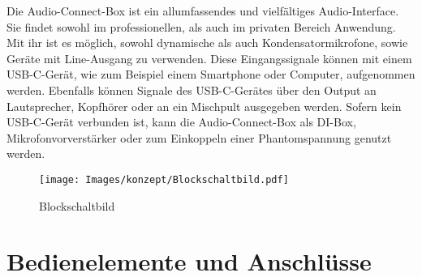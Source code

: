 Die Audio-Connect-Box ist ein allumfassendes und vielfältiges Audio-Interface. 
Sie findet sowohl im professionellen, als auch im privaten Bereich Anwendung.
Mit ihr ist es möglich, sowohl dynamische als auch Kondensatormikrofone, sowie Geräte mit Line-Ausgang zu verwenden. 
Diese Eingangssignale können mit einem USB-C-Gerät, wie zum Beispiel einem Smartphone oder Computer, aufgenommen werden. 
Ebenfalls können Signale des USB-C-Gerätes über den Output an Lautsprecher,
Kopfhörer oder an ein Mischpult ausgegeben werden.
Sofern kein USB-C-Gerät verbunden ist, kann die Audio-Connect-Box als DI-Box, Mikrofonvorverstärker oder zum Einkoppeln einer Phantomspannung genutzt werden.
\vspace{3cm}
    \begin{figure}[H]
        \centering
        \texttt{[image: Images/konzept/Blockschaltbild.pdf]}
        \caption*{Blockschaltbild}
    \end{figure}

\pagebreak

\section{Bedienelemente und Anschlüsse}
